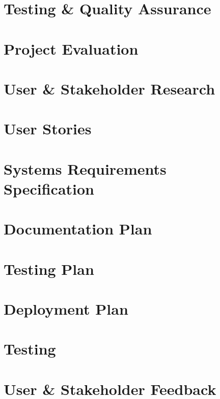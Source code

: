 \documentclass[12pt]{report}
\newcommand\blankpage{%
    \null
    \thispagestyle{empty}%
    \addtocounter{page}{-1}%
    \newpage}
\begin{document}
\chapter{Testing \& Quality Assurance}


\chapter{Project Evaluation}


\afterpage{\blankpage}

\begin{appendices}

\chapter{User \& Stakeholder Research}


\chapter{User Stories}


\chapter{Systems Requirements Specification}


\chapter{Documentation Plan}


\chapter{Testing Plan}


\chapter{Deployment Plan}


\chapter{Testing}


\chapter{User \& Stakeholder Feedback}


\end{appendices}

\printbibliography
{}

\afterpage{\blankpage}
\end{document}
